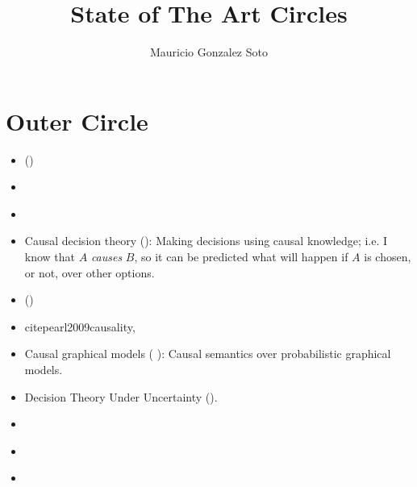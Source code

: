 \documentclass[11pt]{article}
\title{State of The Art Circles}
\author{Mauricio Gonzalez Soto}
\theoremstyle{plain}
\begin{document}
\maketitle
\section{Outer Circle}
\begin{itemize}
\item (\cite{suppes1970probabilistic})
\item \cite{holland1986statistics}
\item \cite{sutton1998reinforcement}
\item Causal decision theory (\cite{joyce1999foundations}): Making decisions using causal knowledge; i.e. I know that $A$ \textit{causes} $B$, so it can be predicted what will happen if $A$ is chosen, or not, over other options. 
\item (\cite{spirtes2000causation})
\item cite{pearl2009causality},
\item Causal graphical models ( \cite{koller2009probabilistic}): Causal semantics over probabilistic graphical models.
\item Decision Theory Under Uncertainty (\cite{gilboa2009decision}).
\item \cite{pearl2014probabilistic}
\item  \cite{danks2014unifying}
\item \cite{gershman2015reinforcement}
\end{itemize}
\end{document}
